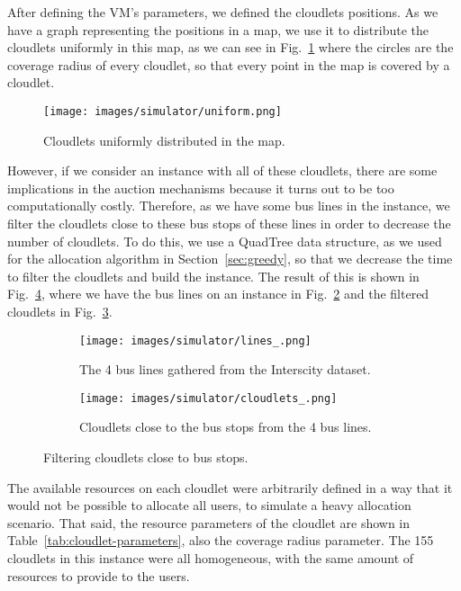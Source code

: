 \documentclass[English]{ic-tese-v3}
\begin{document}
After defining the VM's parameters, we defined the cloudlets positions. As we have a graph representing the positions in a map, we use it to distribute the cloudlets uniformly in this map, as we can see in Fig.~\ref{fig:cl-uniform} where the circles are the coverage radius of every cloudlet, so that every point in the map is covered by a cloudlet.
\begin{figure}[H]
    \centering
    \texttt{[image: images/simulator/uniform.png]}
    \caption{Cloudlets uniformly distributed in the map.}
    \label{fig:cl-uniform}
\end{figure}
However, if we consider an instance with all of these cloudlets, there are some implications in the auction mechanisms because it turns out to be too computationally costly. Therefore, as we have some bus lines in the instance, we filter the cloudlets close to these bus stops of these lines in order to decrease the number of cloudlets. To do this, we use a QuadTree data structure, as we used for the allocation algorithm in Section~\ref{sec:greedy}, so that we decrease the time to filter the cloudlets and build the instance. The result of this is shown in Fig.~\ref{fig:cl_filt}, where we have the bus lines on an instance in Fig.~\ref{fig:cl_filt1} and the filtered cloudlets in Fig.~\ref{fig:cl_filt2}.
\begin{figure}[H]
    \centering
    \begin{subfigure}{.45\textwidth}
        \centering
        \texttt{[image: images/simulator/lines\_.png]}
        \caption{The 4 bus lines gathered from the Interscity dataset.}
        \label{fig:cl_filt1}
    \end{subfigure}
    \begin{subfigure}{.45\textwidth}
        \centering
        \texttt{[image: images/simulator/cloudlets\_.png]}
        \caption{Cloudlets close to the bus stops from the 4 bus lines.}
        \label{fig:cl_filt2}
    \end{subfigure}
    \caption{Filtering cloudlets close to bus stops.}
    \label{fig:cl_filt}
\end{figure}
The available resources on each cloudlet were arbitrarily defined in a way that it would not be possible to allocate all users, to simulate a heavy allocation scenario. That said, the resource parameters of the cloudlet are shown in Table~\ref{tab:cloudlet-parameters}, also the coverage radius parameter. The 155 cloudlets in this instance were all homogeneous, with the same amount of resources to provide to the users.
\end{document}
